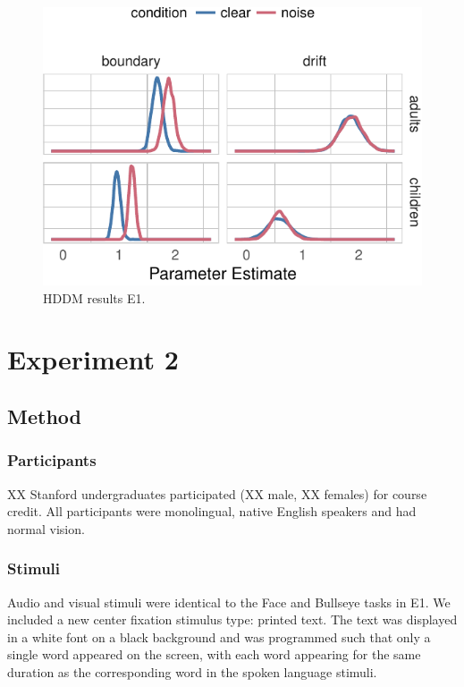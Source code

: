 \documentclass[10pt, letterpaper]{article}
\newenvironment{CodeChunk}{}{}
\begin{document}
\begin{CodeChunk}
\begin{figure}[t]

{\centering \includegraphics[width=0.8\linewidth]{figs/hddm_plot_noise-1} 

}

\caption[HDDM results E1]{HDDM results E1.}\label{fig:hddm_plot_noise}
\end{figure}
\end{CodeChunk}

\section{Experiment 2}\label{experiment-2}

\subsection{Method}\label{method-1}

\subsubsection{Participants}\label{participants-1}

XX Stanford undergraduates participated (XX male, XX females) for course
credit. All participants were monolingual, native English speakers and
had normal vision.

\subsubsection{Stimuli}\label{stimuli-1}

Audio and visual stimuli were identical to the Face and Bullseye tasks
in E1. We included a new center fixation stimulus type: printed text.
The text was displayed in a white font on a black background and was
programmed such that only a single word appeared on the screen, with
each word appearing for the same duration as the corresponding word in
the spoken language stimuli.
\end{document}
